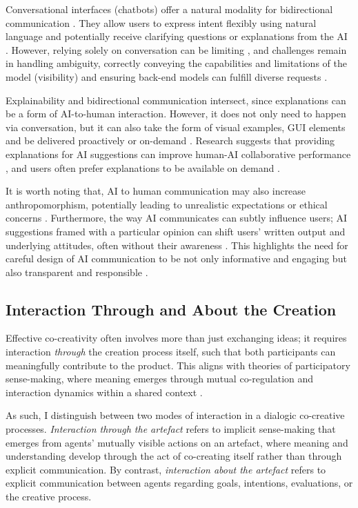 Conversational interfaces (chatbots) offer a natural modality for bidirectional communication \citep{Coenen2021-ym, Zhang2021-ej}. They allow users to express intent flexibly using natural language and potentially receive clarifying questions or explanations from the AI \citep{Coenen2021-ym}. However, relying solely on conversation can be limiting \citep{Tholander2023-rv}, and challenges remain in handling ambiguity, correctly conveying the capabilities and limitations of the model (visibility) and ensuring back-end models can fulfill diverse requests \citep{Zhang2021-ej}.

Explainability and bidirectional communication intersect, since explanations can be a form of AI-to-human interaction. However, it does not only need to happen via conversation, but it can also take the form of visual examples, GUI elements and be delivered proactively or on-demand \citep{Zhu2018-zd}. Research suggests that providing explanations for AI suggestions can improve human-AI collaborative performance \citep{Vaccaro2024-ne}, and users often prefer explanations to be available on demand \citep{Oh2018-mu}.

It is worth noting that, AI to human communication may also increase anthropomorphism, potentially leading to unrealistic expectations or ethical concerns \citep{Rezwana2023-gj, Rezwana2022-ui}. Furthermore, the way AI communicates can subtly influence users; AI suggestions framed with a particular opinion can shift users' written output and underlying attitudes, often without their awareness \citep{Jakesch2023-ks}. This highlights the need for careful design of AI communication to be not only informative and engaging but also transparent and responsible \citep{Jakesch2023-ks, El-Assady2022-qc}.

\subsection{Interaction Through and About the Creation}

Effective co-creativity often involves more than just exchanging ideas; it requires interaction \textit{through} the creation process itself, such that both participants can meaningfully contribute to the product. This aligns with theories of participatory sense-making, where meaning emerges through mutual co-regulation and interaction dynamics within a shared context \citep{Davis2016-te}.

As such, I distinguish between two modes of interaction in a dialogic co-creative processes. \textit{Interaction through the artefact} refers to implicit sense-making that emerges from agents' mutually visible actions on an artefact, where meaning and understanding develop through the act of co-creating itself rather than through explicit communication. By contrast, \textit{interaction about the artefact} refers to explicit communication between agents regarding goals, intentions, evaluations, or the creative process. 

